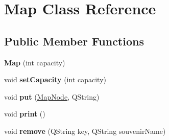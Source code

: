 \hypertarget{class_map}{}\section{Map Class Reference}
\label{class_map}
\subsection*{Public Member Functions}
\begin{DoxyCompactItemize}
\item 
\mbox{\label{class_map_a74002e2be89c3eae7f045db1666933a2}} 
{\bfseries Map} (int capacity)
\item 
\mbox{\label{class_map_a34e3e168f646953aed049c0bf37fb62b}} 
void {\bfseries set\+Capacity} (int capacity)
\item 
\mbox{\label{class_map_aef091383ecb1bd251ca304eafd5c462f}} 
void {\bfseries put} (\hyperlink{class_map_node}{Map\+Node}, Q\+String)
\item 
\mbox{\label{class_map_a9c6dc88a70dcf25e3371d8bc4ec35ad0}} 
void {\bfseries print} ()
\item 
\mbox{\label{class_map_a8cfc8e8ee3a77497b8e6a2fc4cde6e5e}} 
void {\bfseries remove} (Q\+String key, Q\+String souvenir\+Name)
\end{DoxyCompactItemize}
